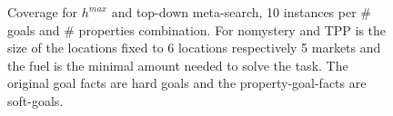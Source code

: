 \begin{figure}[ht]
\begin{tabular}{l|r|rrrrrrrrrr}
	\end{tabular}
	\caption{Coverage for $h^{max}$ and top-down meta-search, 10 instances per \# goals and \# properties combination.
	For nomystery and TPP is the size of the locations fixed to 6 locations respectively 5 markets and the fuel is the 
	minimal amount needed to solve the task.
	The original goal facts are hard goals and the property-goal-facts are soft-goals.}
\end{figure}




